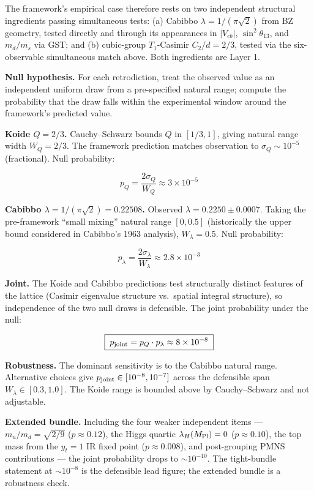 \documentclass[
]{article}
\begin{document}
The framework's empirical case therefore rests on two independent
structural ingredients passing simultaneous tests: (a) Cabibbo
\(\lambda = 1/(\pi\sqrt{2})\) from BZ geometry, tested directly and
through its appearances in \(|V_{cb}|\), \(\sin^2\theta_{13}\), and
\(m_d/m_s\) via GST; and (b) cubic-group \(T_1\)-Casimir
\(C_2/d = 2/3\), tested via the six-observable simultaneous match above.
Both ingredients are Layer 1.

\textbf{Null hypothesis.} For each retrodiction, treat the observed
value as an independent uniform draw from a pre-specified natural range;
compute the probability that the draw falls within the experimental
window around the framework's predicted value.

\textbf{Koide \(Q = 2/3\).} Cauchy--Schwarz bounds \(Q\) in
\([1/3, 1]\), giving natural range width \(W_Q = 2/3\). The framework
prediction matches observation to \(\sigma_Q \sim 10^{-5}\)
(fractional). Null probability:

\[p_Q = \frac{2\sigma_Q}{W_Q} \approx 3 \times 10^{-5}\]

\textbf{Cabibbo \(\lambda = 1/(\pi\sqrt{2}) = 0.22508\).} Observed
\(\lambda = 0.2250 \pm 0.0007\). Taking the pre-framework ``small
mixing'' natural range \([0, 0.5]\) (historically the upper bound
considered in Cabibbo's 1963 analysis), \(W_\lambda = 0.5\). Null
probability:

\[p_\lambda = \frac{2\sigma_\lambda}{W_\lambda} \approx 2.8 \times 10^{-3}\]

\textbf{Joint.} The Koide and Cabibbo predictions test structurally
distinct features of the lattice (Casimir eigenvalue structure
vs.~spatial integral structure), so independence of the two null draws
is defensible. The joint probability under the null:

\[\boxed{\; p_{\rm joint} = p_Q \cdot p_\lambda \approx 8 \times 10^{-8} \;}\]

\textbf{Robustness.} The dominant sensitivity is to the Cabibbo natural
range. Alternative choices give \(p_{\rm joint} \in [10^{-8}, 10^{-7}]\)
across the defensible span \(W_\lambda \in [0.3, 1.0]\). The Koide range
is bounded above by Cauchy--Schwarz and not adjustable.

\textbf{Extended bundle.} Including the four weaker independent items
--- \(m_u/m_d = \sqrt{2/9}\) (\(p \approx 0.12\)), the Higgs quartic
\(\lambda_H(M_{\rm Pl}) = 0\) (\(p \approx 0.10\)), the top mass from
the \(y_t = 1\) IR fixed point (\(p \approx 0.008\)), and post-grouping
PMNS contributions --- the joint probability drops to \(\sim 10^{-10}\).
The tight-bundle statement at \(\sim 10^{-8}\) is the defensible lead
figure; the extended bundle is a robustness check.
\end{document}
